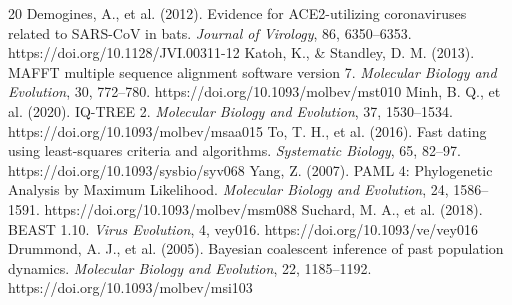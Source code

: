 \documentclass[10pt,letterpaper]{article}
\begin{document}
\begin{thebibliography}{20}
 Demogines, A., et al. (2012). Evidence for ACE2-utilizing coronaviruses related to SARS-CoV in bats. \emph{Journal of Virology}, 86, 6350--6353. https://doi.org/10.1128/JVI.00311-12
 Katoh, K., \& Standley, D. M. (2013). MAFFT multiple sequence alignment software version 7. \emph{Molecular Biology and Evolution}, 30, 772--780. https://doi.org/10.1093/molbev/mst010
 Minh, B. Q., et al. (2020). IQ-TREE 2. \emph{Molecular Biology and Evolution}, 37, 1530--1534. https://doi.org/10.1093/molbev/msaa015
 To, T. H., et al. (2016). Fast dating using least-squares criteria and algorithms. \emph{Systematic Biology}, 65, 82--97. https://doi.org/10.1093/sysbio/syv068
 Yang, Z. (2007). PAML 4: Phylogenetic Analysis by Maximum Likelihood. \emph{Molecular Biology and Evolution}, 24, 1586--1591. https://doi.org/10.1093/molbev/msm088
 Suchard, M. A., et al. (2018). BEAST 1.10. \emph{Virus Evolution}, 4, vey016. https://doi.org/10.1093/ve/vey016
 Drummond, A. J., et al. (2005). Bayesian coalescent inference of past population dynamics. \emph{Molecular Biology and Evolution}, 22, 1185--1192. https://doi.org/10.1093/molbev/msi103
\end{thebibliography}
\end{document}
